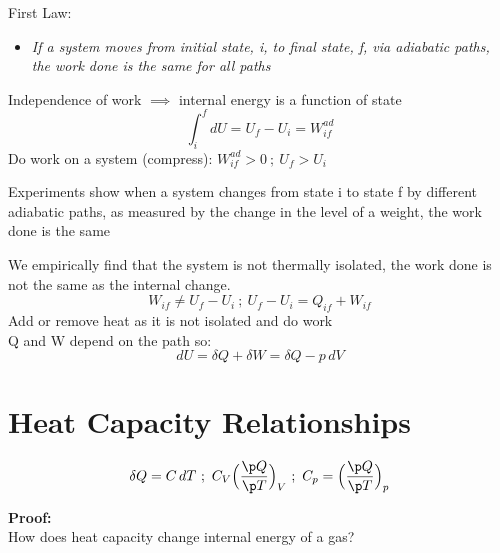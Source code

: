 \documentclass[a4paper, 11pt, normalem]{report}
\begin{document}
First Law:
\begin{itemize}
    \item \emph{If a system moves from initial state, i, to final state, f, via adiabatic paths, the work done is the same for all paths}
\end{itemize}
Independence of work $\implies$ internal energy is a function of state
\begin{equation*}
    \int_{i}^{f} dU = U_f - U_i = W_{if}^{ad}
\end{equation*}
Do work on a system (compress): $W_{if}^{ad} > 0 ~;~ U_f > U_i$

Experiments show when a system changes from state i to state f by different adiabatic paths, as measured by the change in the level of a weight, the work done is the same

We empirically find that the system is not thermally isolated, the work done is not the same as the internal change.
\begin{equation*}
    W_{if} \neq U_f - U_i ~;~ U_f - U_i = Q_{if} + W_{if}
\end{equation*}
Add or remove heat as it is not isolated and do work \\
Q and W depend on the path so:
\begin{equation*}
    dU = \delta Q + \delta W = \delta Q - p\,dV
\end{equation*}

\section{Heat Capacity Relationships}
\begin{equation*}
    \delta Q = C\,dT ~;~ C_{V} \Big(\frac{\p Q}{\p T}\Big)_{V} ~;~ C_{p} = \Big(\frac{\p Q}{\p T} \Big)_{p}
\end{equation*}

\textbf{Proof:}\\
How does heat capacity change internal energy of a gas?
\end{document}
